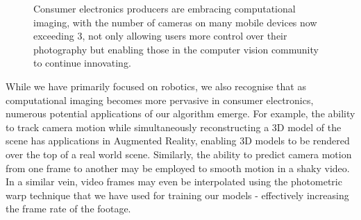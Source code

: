 \begin{figure}[H]

    \caption[Examples of multi-view imaging being introduced in consumer devices]{
        Consumer electronics producers are embracing computational imaging, with the number of cameras on many mobile devices now exceeding 3, not only allowing users more control over their photography but enabling those in the computer vision community to continue innovating. 
    }
    
\end{figure}


While we have primarily focused on robotics, we also recognise that as computational imaging becomes more pervasive in consumer electronics, numerous potential applications of our algorithm emerge. For example, the ability to track camera motion while simultaneously reconstructing a 3D model of the scene has applications in Augmented Reality, enabling 3D models to be rendered over the top of a real world scene. Similarly, the ability to predict camera motion from one frame to another may be employed to smooth motion in a shaky video. In a similar vein, video frames may even be interpolated using the photometric warp technique that we have used for training our models - effectively increasing the frame rate of the footage.

